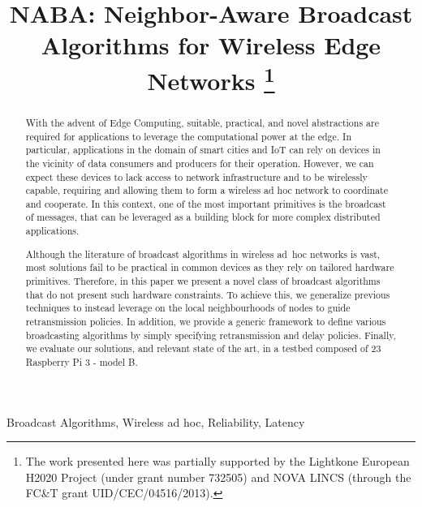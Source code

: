 \documentclass[conference]{IEEEtran}
\begin{document}
\title{NABA: Neighbor-Aware Broadcast Algorithms for Wireless Edge Networks
\thanks{The work presented here was partially supported by the Lightkone European H2020 Project (under grant number 732505) and NOVA LINCS (through the FC\&T grant UID/CEC/04516/2013).}
}

\author{
}

\maketitle

\begin{abstract}
With the advent of Edge Computing, suitable, practical, and novel abstractions are required for applications to leverage the computational power at the edge. 
In particular, applications in the domain of smart cities and IoT can rely on devices in the vicinity of data consumers and producers for their operation.
However, we can expect these devices to lack access to network infrastructure and to be wirelessly capable, requiring and allowing them to form a wireless ad hoc network to coordinate and cooperate.
In this context, one of the most important primitives is the broadcast of messages, that can be leveraged as a building block for more complex distributed applications.

Although the literature of broadcast algorithms in wireless ad~hoc networks is vast, most solutions fail to be practical in common devices as they rely on tailored hardware primitives.
Therefore, in this paper we present a novel class of broadcast algorithms that do not present such hardware constraints. To achieve this, we generalize previous techniques to instead leverage on the local neighbourhoods of nodes to guide retransmission policies.
In addition, we provide a generic framework to define various broadcasting algorithms by simply specifying retransmission and delay policies.
Finally, we evaluate our solutions, and relevant state of the art, in a testbed composed of 23 Raspberry Pi 3 - model B.

\end{abstract}

\begin{IEEEkeywords}
Broadcast Algorithms,
Wireless ad hoc,
Reliability,
Latency
\end{IEEEkeywords}
\end{document}
